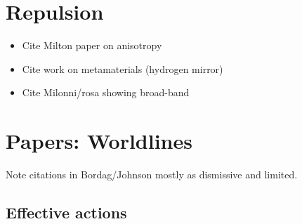 




\section{Repulsion}

\begin{itemize}
\item Cite Milton paper on anisotropy \cite{Milton2012, Milton2012a}
\item Cite work on metamaterials (hydrogen mirror)
\item Cite Milonni/rosa showing broad-band \cite{Rosa2010}
\end{itemize}

\section{Papers: Worldlines}

Note citations in Bordag/Johnson mostly as dismissive and limited.  

\subsection{Effective actions}

\cite{McKeon1993, Strassler1992,Schubert2001}


